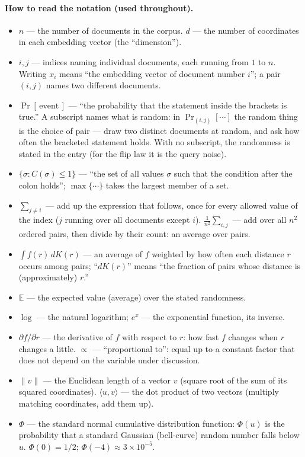 \documentclass[11pt,letterpaper]{article}
\newcommand{\E}{\mathbb{E}}
\begin{document}
\paragraph{How to read the notation (used throughout).}
\begin{itemize}
  \item $n$ --- the number of documents in the corpus. $d$ --- the number
  of coordinates in each embedding vector (the ``dimension'').
  \item $i, j$ --- indices naming individual documents, each running from
  $1$ to $n$. Writing $x_i$ means ``the embedding vector of document number
  $i$''; a pair $(i,j)$ names two different documents.
  \item $\Pr[\,\text{event}\,]$ --- ``the probability that the statement
  inside the brackets is true.'' A subscript names what is random: in
  $\Pr_{(i,j)}[\cdots]$ the random thing is the choice of pair --- draw two
  distinct documents at random, and ask how often the bracketed statement
  holds. With no subscript, the randomness is stated in the entry (for the
  flip law it is the query noise).
  \item $\{\sigma : C(\sigma) \le 1\}$ --- ``the set of all values $\sigma$
  such that the condition after the colon holds''; $\max\{\cdots\}$ takes
  the largest member of a set.
  \item $\sum_{j \ne i}$ --- add up the expression that follows, once for
  every allowed value of the index ($j$ running over all documents except
  $i$). $\frac{1}{n^2}\sum_{i,j}$ --- add over all $n^2$ ordered pairs,
  then divide by their count: an average over pairs.
  \item $\int f(r)\, dK(r)$ --- an average of $f$ weighted by how often
  each distance $r$ occurs among pairs; ``$dK(r)$'' means ``the fraction of
  pairs whose distance is (approximately) $r$.''
  \item $\E$ --- the expected value (average) over the stated randomness.
  \item $\log$ --- the natural logarithm; $e^{x}$ --- the exponential
  function, its inverse.
  \item $\partial f / \partial r$ --- the derivative of $f$ with respect to
  $r$: how fast $f$ changes when $r$ changes a little. $\propto$ ---
  ``proportional to'': equal up to a constant factor that does not depend
  on the variable under discussion.
  \item $\lVert v \rVert$ --- the Euclidean length of a vector $v$ (square
  root of the sum of its squared coordinates). $\langle u, v \rangle$ ---
  the dot product of two vectors (multiply matching coordinates, add them
  up).
  \item $\Phi$ --- the standard normal cumulative distribution function:
  $\Phi(u)$ is the probability that a standard Gaussian (bell-curve) random
  number falls below $u$. $\Phi(0) = 1/2$; $\Phi(-4) \approx 3 \times
  10^{-5}$.
\end{itemize}
\end{document}
